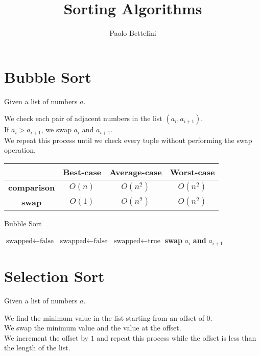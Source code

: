 \documentclass[a4paper]{article}
\title{Sorting Algorithms}
\author{Paolo Bettelini}
\date{}
\begin{document}
\maketitle
\tableofcontents
\pagebreak

\section{Bubble Sort}

Given a list of numbers \(a\).

We check each pair of adjacent numbers in the list \((a_i,a_{i+1})\).\\
If \(a_i>a_{i+1}\), we swap \(a_i\) and \(a_{i+1}\).\\
We repeat this process until we check every tuple without performing the swap operation.

\def\arraystretch{1.5}
\begin{center}
	\begin{tabular}{ |c|c|c|c| }
		\hline
		& \textbf{Best-case} & \textbf{Average-case} &\textbf{Worst-case} \\
		\hline
		\textbf{comparison} & \(O(n)\) & \(O(n^2)\) & \(O(n^2)\) \\ 
		\hline
		\textbf{swap} & \(O(1)\) & \(O(n^2)\) & \(O(n^2)\) \\ 
		\hline
	\end{tabular}
\end{center}

\begin{algorithm}
	\begin{algorithmic}
		\caption{Bubble Sort}
		\State \(\text{swapped}\gets\text{false}\)
		\Do{}
			\State \(\text{swapped}\gets\text{false}\)
					\State \(\text{swapped}\gets\text{true}\)
					\State \textbf{swap} \(a_i\) \textbf{and} \(a_{i+1}\)
				\EndIf
			\EndFor
	\end{algorithmic}
\end{algorithm}

\pagebreak

\section{Selection Sort}

Given a list of numbers \(a\).

We find the minimum value in the list starting from an offset of \(0\).\\
We swap the minimum value and the value at the offset.\\
We increment the offset by \(1\) and repeat this process while the offset is less than the length of the list.
\end{document}
